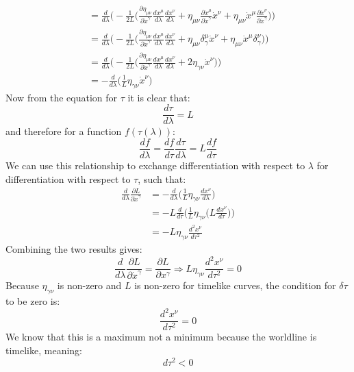 \documentclass[9pt]{report}
\begin{document}
\begin{enumerate}
\[\begin{align}
                                                                    &= \frac{d}{d\lambda} \Big( -\frac{1}{2L} \Big(\frac{\partial\eta_{\mu\nu}}{\partial \dot{x}^\gamma}\frac{dx^\mu}{d\lambda} \frac{dx^\nu}{d\lambda} + \eta_{\mu\nu} \frac{\partial\dot{x}^\mu}{\partial\dot{x}^\gamma} \dot{x}^\nu + \eta_{\mu\nu} \dot{x}^\mu \frac{\partial\dot{x}^\nu}{\partial\dot{x}^\gamma} \Big) \Big) \\
                                                                    &= \frac{d}{d\lambda} \Big( -\frac{1}{2L} \Big(\frac{\partial\eta_{\mu\nu}}{\partial \dot{x}^\gamma}\frac{dx^\mu}{d\lambda} \frac{dx^\nu}{d\lambda} + \eta_{\mu\nu} \delta^\mu_\gamma \dot{x}^\nu + \eta_{\mu\nu} \dot{x}^\mu \delta^\nu_\gamma \Big) \Big) \\
                                                                    &= \frac{d}{d\lambda} \Big( -\frac{1}{2L} \Big(\frac{\partial\eta_{\mu\nu}}{\partial \dot{x}^\gamma}\frac{dx^\mu}{d\lambda} \frac{dx^\nu}{d\lambda} + 2 \eta_{\gamma\nu} \dot{x}^\nu \Big)\Big)\\
                                                                    &= - \frac{d}{d\lambda} \Big(\frac{1}{L}\eta_{\gamma\nu} \dot{x}^\nu \Big)
    \end{align}
  \]
  Now from the equation for $\tau$ it is clear that: 
  \[
    \frac{d\tau}{d\lambda} = L
  \]
  and therefore for a function $f(\tau(\lambda))$:
  \[
    \frac{df}{d\lambda} = \frac{df}{d\tau} \frac{d\tau}{d\lambda} = L \frac{df}{d\tau}
  \]
  We can use this relationship to exchange differentiation with respect to $\lambda$
  for differentiation with respect to $\tau$, such that:
  \[
    \begin{align}
      \frac{d}{d\lambda} \frac{\partial L}{\partial \dot{x}^\gamma} &= - \frac{d}{d\lambda} \Big(\frac{1}{L}\eta_{\gamma\nu} \frac{dx^\nu}{d\lambda} \Big) \\
                                                                    &= - L\frac{d}{d\tau} \Big(\frac{1}{L}\eta_{\gamma\nu} \Big(L\frac{dx^\nu}{d\tau} \Big)\Big) \\
                                                                    &= - L\eta_{\gamma\nu} \frac{d^2x^\nu}{d\tau^2}
    \end{align}
  \]
  Combining the two results gives:
  \[
    \frac{d}{d\lambda} \frac{\partial L}{\partial \dot{x}^\gamma} = \frac{\partial L}{\partial x^\gamma} \Rightarrow L \eta_{\gamma\nu} \frac{d^2x^\nu}{d\tau^2} = 0
  \]
  Because $\eta_{\gamma\nu}$ is non-zero and $L$ is non-zero for timelike curves, the condition for $\delta \tau$ to be zero is:
  \[
    \frac{d^2x^\nu}{d\tau^2} = 0
  \]
  We know that this is a maximum not a minimum because the worldline is timelike,
  meaning:
  \[
    d\tau^2 < 0
  \]
\end{enumerate}
\end{document}
